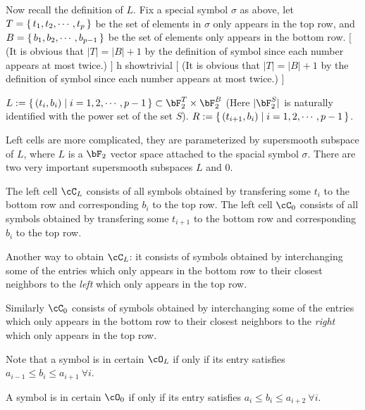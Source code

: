 \documentclass[12pt,a4paper]{amsart}
\newcommand{\trivial}[2][]{\if\relax\detokenize{#1}\relax
  {%
      \color{orange} \vspace{0em} $[$  #2 $]$
      \color{black}
  }
  \else
\ifx#1h
\ifcsname showtrivial\endcsname
{%
    \color{orange} \vspace{0em}  $[$ #2 $]$
    \color{black}
}
\fi
\else {\red Wrong argument!} \fi
\fi
}
\numberwithin{equation}{section}
\theoremstyle{remark}
\begin{document}
  Now recall the definition of $L$. Fix a special symbol $\sigma$ as above, let
  $T = \set{t_1, t_2, \cdots, t_p}$ be the set of elements in $\sigma$ only
  appears in the top row, and $B = \set{b_1, b_2, \cdots, b_{p-1}}$ be the set
  of elements only appears in the bottom row.  \trivial{ (It is obvious that
    $|T| = |B|+1$ by the definition of symbol since each number appears at most
    twice.)  }
  $L := \set{(t_i,b_i)| i=1,2,\cdots,p-1} \subset \bF_2^T\times \bF_2^B$ (Here
  $|\bF_2^S|$ is naturally identified with the power set of the set $S$).
  $R := \set{(t_{i+1},b_i)|i = 1,2,\cdots, p-1}$.

  
  
  Left cells are more complicated, they are parameterized by supersmooth
  subspace of $L$, where $L$ is a $\bF_2$ vector space attached to the spacial
  symbol $\sigma$.  There are two very important supersmooth subspaces $L$ and
  $0$.

  The left cell $\cC_L$ consists of all symbols obtained by transfering some
  $t_i$ to the bottom row and corresponding $b_i$ to the top row.  The left cell
  $\cC_0$ consists of all symbols obtained by transfering some $t_{i+1}$ to the
  bottom row and corresponding $b_i$ to the top row.

  Another way to obtain $\cC_L$: it consists of symbols obtained by
  interchanging some of the entries which only appears in the bottom row to
  their closest neighbors to the \emph{left} which only appears in the top row.

  Similarly $\cC_0$ consists of symbols obtained by interchanging some of the
  entries which only appears in the bottom row to their closest neighbors to the
  \emph{right} which only appears in the top row.

  Note that a symbol is in certain $\cO_L$ if only if its entry satisfies
  $a_{i-1} \leq b_{i}\leq a_{i+1} \ \forall i$.

  A symbol is in certain $\cO_0$ if only if its entry satisfies
  $a_i \leq b_{i}\leq a_{i+2} \ \forall i$.
  
\end{document}
